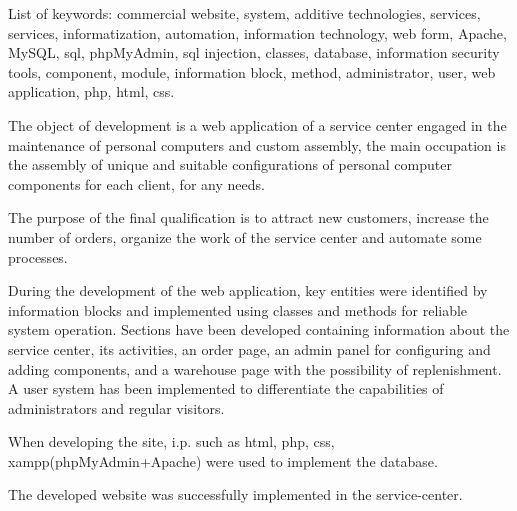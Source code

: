 List of keywords: commercial website, system, additive technologies, services, services, informatization, automation, information technology, web form, Apache, MySQL, sql, phpMyAdmin, sql injection, classes, database, information security tools, component, module, information block, method, administrator, user, web application, php, html, css.

The object of development is a web application of a service center engaged in the maintenance of personal computers and custom assembly, the main occupation is the assembly of unique and suitable configurations of personal computer components for each client, for any needs.

The purpose of the final qualification is to attract new customers, increase the number of orders, organize the work of the service center and automate some processes.

During the development of the web application, key entities were identified by information blocks and implemented using classes and methods for reliable system operation. Sections have been developed containing information about the service center, its activities, an order page, an admin panel for configuring and adding components, and a warehouse page with the possibility of replenishment. A user system has been implemented to differentiate the capabilities of administrators and regular visitors.

When developing the site, i.p. such as html, php, css, xampp(phpMyAdmin+Apache) were used to implement the database.

The developed website was successfully implemented in the service-center.
